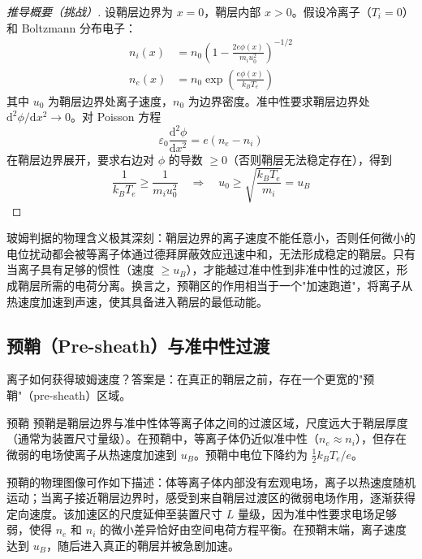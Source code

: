 \documentclass[12pt,a4paper,openany,oneside]{book}
\newcommand{\diff}{\mathrm{d}}
\newcommand{\eps}{\varepsilon}
\begin{document}
\begin{proof}[推导概要（挑战）]
设鞘层边界为 $x=0$，鞘层内部 $x>0$。假设冷离子（$T_i = 0$）和 Boltzmann 分布电子：
\begin{align}
n_i(x) &= n_0 \left(1 - \frac{2e\phi(x)}{m_i u_0^2}\right)^{-1/2} \\
n_e(x) &= n_0 \exp\!\left(\frac{e\phi(x)}{k_B T_e}\right)
\label{eq:ch11-sheath-densities}
\end{align}
其中 $u_0$ 为鞘层边界处离子速度，$n_0$ 为边界密度。准中性要求鞘层边界处 $\diff^2\phi/\diff x^2 \to 0$。对 Poisson 方程
\begin{equation}
\eps_0 \frac{\diff^2\phi}{\diff x^2} = e(n_e - n_i)
\label{eq:ch11-sheath-poisson}
\end{equation}
在鞘层边界展开，要求右边对 $\phi$ 的导数 $\ge 0$（否则鞘层无法稳定存在），得到
\begin{equation}
\frac{1}{k_B T_e} \ge \frac{1}{m_i u_0^2} \quad\Rightarrow\quad u_0 \ge \sqrt{\frac{k_B T_e}{m_i}} = u_B
\label{eq:ch11-bohm-criterion}
\end{equation}
\end{proof}

\begin{insight}{}{}
玻姆判据的物理含义极其深刻：鞘层边界的离子速度不能任意小，否则任何微小的电位扰动都会被等离子体通过德拜屏蔽效应迅速中和，无法形成稳定的鞘层。只有当离子具有足够的惯性（速度 $\ge u_B$），才能越过准中性到非准中性的过渡区，形成鞘层所需的电荷分离。换言之，预鞘区的作用相当于一个"加速跑道"，将离子从热速度加速到声速，使其具备进入鞘层的最低动能。
\end{insight}

\subsection{预鞘（Pre-sheath）与准中性过渡}

离子如何获得玻姆速度？答案是：在真正的鞘层之前，存在一个更宽的"预鞘"（pre-sheath）区域。

\begin{definition}{预鞘}{}{}
\label{def:pre-sheath}
预鞘是鞘层边界与准中性体等离子体之间的过渡区域，尺度远大于鞘层厚度（通常为装置尺寸量级）。在预鞘中，等离子体仍近似准中性（$n_e \approx n_i$），但存在微弱的电场使离子从热速度加速到 $u_B$。预鞘中电位下降约为 $\frac{1}{2}k_B T_e/e$。
\end{definition}

\begin{insight}{}{}
预鞘的物理图像可作如下描述：体等离子体内部没有宏观电场，离子以热速度随机运动；当离子接近鞘层边界时，感受到来自鞘层过渡区的微弱电场作用，逐渐获得定向速度。该加速区的尺度延伸至装置尺寸 $L$ 量级，因为准中性要求电场足够弱，使得 $n_e$ 和 $n_i$ 的微小差异恰好由空间电荷方程平衡。在预鞘末端，离子速度达到 $u_B$，随后进入真正的鞘层并被急剧加速。
\end{insight}
\end{document}
